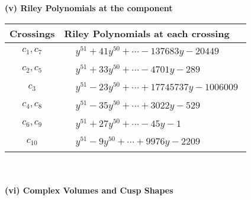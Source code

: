\documentclass[1p]{elsarticle_modified}
\theoremstyle{definition}
\begin{document}
\newpage\renewcommand{\arraystretch}{1}
\flushleft \textbf{(v) Riley Polynomials at the component}\newline \\
\begin{tabular}{m{50pt}|m{274pt}}
Crossings & \hspace{64pt}Riley Polynomials at each crossing \\
\hline $$\begin{aligned}c_{1},c_{7}\end{aligned}$$&$\begin{aligned}
&y^{51}+41 y^{50}+\cdots-137683 y-20449
\end{aligned}$\\
\hline $$\begin{aligned}c_{2},c_{5}\end{aligned}$$&$\begin{aligned}
&y^{51}+33 y^{50}+\cdots-4701 y-289
\end{aligned}$\\
\hline $$\begin{aligned}c_{3}\end{aligned}$$&$\begin{aligned}
&y^{51}-23 y^{50}+\cdots+17745737 y-1006009
\end{aligned}$\\
\hline $$\begin{aligned}c_{4},c_{8}\end{aligned}$$&$\begin{aligned}
&y^{51}-35 y^{50}+\cdots+3022 y-529
\end{aligned}$\\
\hline $$\begin{aligned}c_{6},c_{9}\end{aligned}$$&$\begin{aligned}
&y^{51}+27 y^{50}+\cdots-45 y-1
\end{aligned}$\\
\hline $$\begin{aligned}c_{10}\end{aligned}$$&$\begin{aligned}
&y^{51}-9 y^{50}+\cdots+9976 y-2209
\end{aligned}$\\
\hline
\end{tabular}\\~\\
\newpage\flushleft \textbf{(vi) Complex Volumes and Cusp Shapes}
\end{document}
